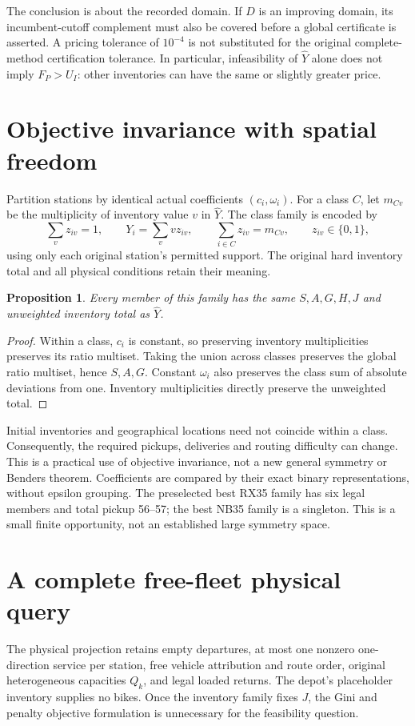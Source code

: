 \documentclass[11pt]{article}
\newtheorem{proposition}{Proposition}
\begin{document}
The conclusion is about the recorded domain. If $D$ is an improving
domain, its incumbent-cutoff complement must also be covered before a
global certificate is asserted. A pricing tolerance of $10^{-4}$ is not
substituted for the original complete-method certification tolerance.
In particular, infeasibility of $\widehat Y$ alone does not imply
$F_P>U_I$: other inventories can have the same or slightly greater price.

\section{Objective invariance with spatial freedom}
Partition stations by identical actual coefficients $(c_i,\omega_i)$.
For a class $C$, let $m_{Cv}$ be the multiplicity of inventory value $v$
in $\widehat Y$. The class family is encoded by
\[
 \sum_v z_{iv}=1,\qquad Y_i=\sum_v vz_{iv},\qquad
 \sum_{i\in C}z_{iv}=m_{Cv},\qquad z_{iv}\in\{0,1\},
\]
using only each original station's permitted support. The original hard
inventory total and all physical conditions retain their meaning.

\begin{proposition}
Every member of this family has the same $S,A,G,H,J$ and unweighted
inventory total as $\widehat Y$.
\end{proposition}
\begin{proof}
Within a class, $c_i$ is constant, so preserving inventory multiplicities
preserves its ratio multiset. Taking the union across classes preserves
the global ratio multiset, hence $S,A,G$. Constant $\omega_i$ also
preserves the class sum of absolute deviations from one. Inventory
multiplicities directly preserve the unweighted total.
\end{proof}

Initial inventories and geographical locations need not coincide within
a class. Consequently, the required pickups, deliveries and routing
difficulty can change. This is a practical use of objective invariance,
not a new general symmetry or Benders theorem. Coefficients are compared
by their exact binary representations, without epsilon grouping. The
preselected best RX35 family has six legal members and total pickup 56--57;
the best NB35 family is a singleton. This is a small finite opportunity,
not an established large symmetry space.

\section{A complete free-fleet physical query}
The physical projection retains empty departures, at most one nonzero
one-direction service per station, free vehicle attribution and route
order, original heterogeneous capacities $Q_k$, and legal loaded returns.
The depot's placeholder inventory supplies no bikes. Once the inventory
family fixes $J$, the Gini and penalty objective formulation is unnecessary
for the feasibility question.
\end{document}
